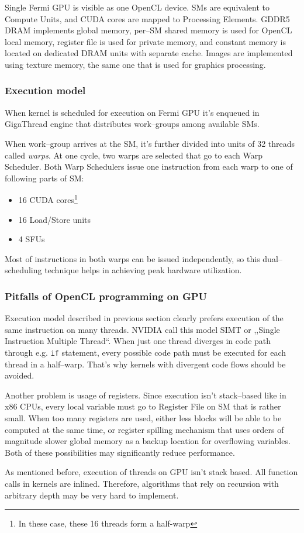 Single Fermi GPU is visible as one OpenCL device. SMs are equivalent to Compute
Units, and CUDA cores are mapped to Processing Elements. GDDR5 DRAM implements
global memory, per--SM shared memory is used for OpenCL local memory,
register file is used for private memory, and constant memory is located on
dedicated DRAM units with separate cache. Images are implemented using texture
memory, the same one that is used for graphics processing.

\subsubsection{Execution model}

When kernel is scheduled for execution on Fermi GPU it's enqueued in GigaThread
engine that distributes work--groups among available SMs.

When work--group arrives at the SM, it's further divided into units of 32 threads
called \emph{warps}. At one cycle, two warps are selected that go to each
Warp Scheduler. Both Warp Schedulers issue one instruction from each warp to
one of following parts of SM:
\begin{itemize}
  \item 16 CUDA cores\footnote{In these case, these 16 threads form a half-warp}
  \item 16 Load/Store units
  \item 4 SFUs
\end{itemize}

Most of instructions in both warps can be issued independently, so this
dual--scheduling technique helps in achieving peak hardware utilization.

\subsubsection{Pitfalls of OpenCL programming on GPU}

Execution model described in previous section clearly prefers execution of the same instruction
on many threads. NVIDIA call this model SIMT or ,,Single Instruction Multiple
Thread``. When just one thread diverges in code path through e.g. \texttt{if}
statement, every possible code path must be executed for each thread in a half--warp.
That's why kernels with divergent code flows should be avoided.

Another problem is usage of registers. Since execution isn't stack--based like
in x86 CPUs, every local variable must go to Register File on SM that is rather
small. When too many registers are used, either less blocks will be able to
be computed at the same time, or register spilling mechanism that uses orders
of magnitude slower global memory as a backup location for overflowing variables.
Both of these possibilities may significantly reduce performance.

As mentioned before, execution of threads on GPU isn't stack based. All function
calls in kernels are inlined. Therefore, algorithms that rely on recursion with
arbitrary depth may be very hard to implement.
